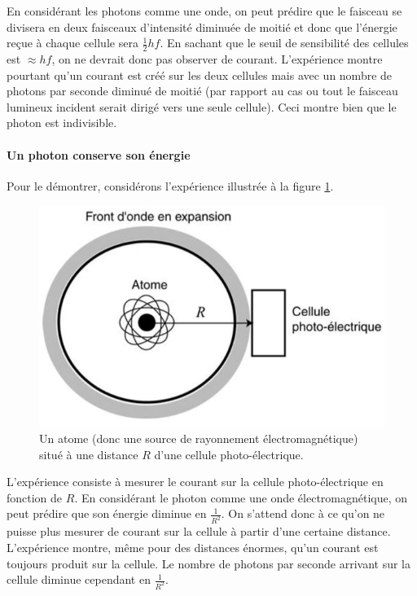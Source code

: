 En considérant les photons comme une onde, on peut prédire
que le faisceau se divisera en deux faisceaux d'intensité diminuée
de moitié et donc que l'énergie reçue à chaque cellule sera $\frac{1}{2}hf$.
En sachant que le seuil de sensibilité des cellules est $\approx hf$,
on ne devrait donc pas observer de courant. L'expérience
montre pourtant qu'un courant est créé sur les deux cellules mais
avec un nombre de photons par seconde diminué de moitié (par rapport
au cas ou tout le faisceau lumineux incident serait dirigé vers une seule
cellule). Ceci montre bien que le photon est indivisible.

\paragraph{Un photon conserve son énergie}
Pour le démontrer, considérons l'expérience illustrée
à la figure \ref{fig:exp-photon2}.

\begin{figure}[ht!]
	\centering
	\includegraphics[scale=0.5]{img/exp_photon_2.jpg}
	\caption{Un atome (donc une source de rayonnement
	électromagnétique) situé à une distance $R$ d'une cellule
	photo-électrique.}
	\label{fig:exp-photon2}
\end{figure}

L'expérience consiste à mesurer le courant
sur la cellule photo-électrique en fonction de $R$.
En considérant le photon comme une onde électromagnétique,
on peut prédire que son énergie diminue en $\frac{1}{R^2}$. On s'attend
donc à ce qu'on ne puisse plus mesurer de courant sur
la cellule à partir d'une certaine distance.
L'expérience montre, même pour des distances énormes,
qu'un courant est toujours produit sur la cellule.
Le nombre de photons par seconde arrivant sur la cellule
diminue cependant en $\frac{1}{R^2}$.

